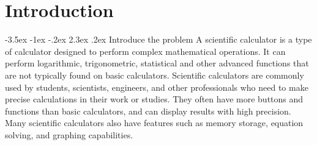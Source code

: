 \documentclass[a4paper, twoside]{report}
\makeatletter
\renewcommand\section{\@startsection {section}{1}{-1em}%
  {-3.5ex \@plus -1ex \@minus -.2ex}%
  {2.3ex \@plus.2ex}%
  {\normalfont\Large\bfseries}}
\makeatother
\begin{document}





\chapter{Introduction}
\section{Introduce the problem}
A scientific calculator is a type of calculator designed to perform complex mathematical operations. It can perform logarithmic, trigonometric, statistical and other advanced functions that are not typically found on basic calculators. Scientific calculators are commonly used by students, scientists, engineers, and other professionals who need to make precise calculations in their work or studies. They often have more buttons and functions than basic calculators, and can display results with high precision. Many scientific calculators also have features such as memory storage, equation solving, and graphing capabilities.
\end{document}
